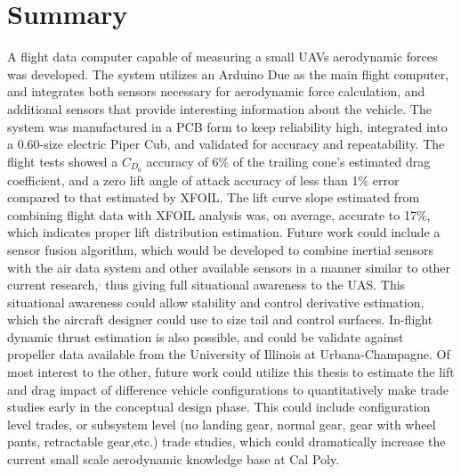 \chapter{Summary}
\label{summary}
A flight data computer capable of measuring a small UAVs aerodynamic forces was developed. The system utilizes an Arduino Due as the main flight computer, and integrates both sensors necessary for aerodynamic force calculation, and additional sensors that provide interesting information about the vehicle. The system was manufactured in a PCB form to keep reliability high, integrated into a 0.60-size electric Piper Cub, and validated for accuracy and repeatability. The flight tests showed a $C_{D_0}$ accuracy of 6\% of the trailing cone's estimated drag coefficient, and a zero lift angle of attack accuracy of less than 1\% error compared to that estimated by XFOIL. The lift curve slope estimated from combining flight data with XFOIL analysis was, on average, accurate to 17\%, which indicates proper lift distribution estimation. Future work could include a sensor fusion algorithm, which would be developed to combine inertial sensors with the air data system and other available sensors in a manner similar to other current research,\cite{wvINSAirData}$^,$\cite{gtUKF} thus giving full situational awareness to the UAS. This situational awareness could allow stability and control derivative estimation, which the aircraft designer could use to size tail and control surfaces. In-flight dynamic thrust estimation is also possible, and could be validate against propeller data available from the University of Illinois at Urbana-Champagne.\cite{brandt2011propeller} Of most interest to the other, future work could utilize this thesis to estimate the lift and drag impact of difference vehicle configurations to quantitatively make trade studies early in the conceptual design phase. This could include configuration level trades, or subsystem level (no landing gear, normal gear, gear with wheel pants, retractable gear,etc.) trade studies, which could dramatically increase the current small scale aerodynamic knowledge base at Cal Poly.